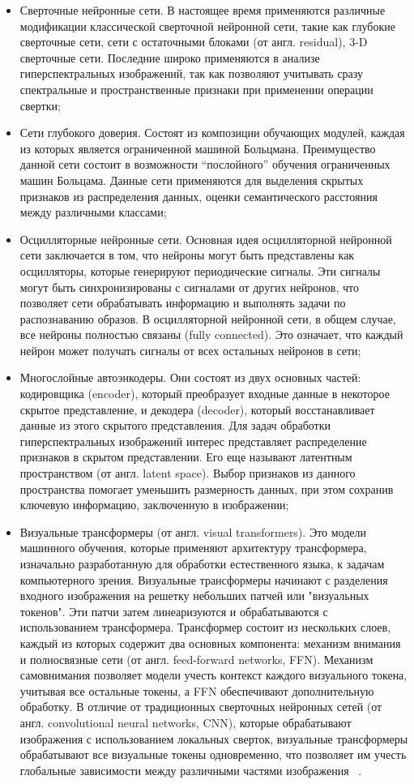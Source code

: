 \documentclass[14pt, russian]{scrartcl}
\begin{document}
\begin{itemize}
    \item Сверточные нейронные сети. В настоящее время применяются различные модификации классической сверточной нейронной сети, такие как глубокие сверточные сети, сети с остаточными блоками (от англ. residual), 3-D сверточные сети. Последние широко применяются в анализе гиперспектральных изображений, так как позволяют учитывать сразу спектральные и пространственные признаки при применении операции свертки;
    \item Сети глубокого доверия. Состоят из композиции обучающих модулей, каждая из которых является ограниченной машиной Больцмана. Преимущество данной сети состоит в возможности “послойного” обучения ограниченных машин Больцама. Данные сети применяются для выделения скрытых признаков из распределения данных, оценки семантического расстояния между различными классами;
    \item Осцилляторные нейронные сети. Основная идея осцилляторной нейронной сети заключается в том, что нейроны могут быть представлены как осцилляторы, которые генерируют периодические сигналы. Эти сигналы могут быть синхронизированы с сигналами от других нейронов, что позволяет сети обрабатывать информацию и выполнять задачи по распознаванию образов. В осцилляторной нейронной сети, в общем случае, все нейроны полностью связаны (fully connected). Это означает, что каждый нейрон может получать сигналы от всех остальных нейронов в сети;
    \item Многослойные автоэнкодеры. Они состоят из двух основных частей: кодировщика (encoder), который преобразует входные данные в некоторое скрытое представление, и декодера (decoder), который восстанавливает данные из этого скрытого представления. Для задач обработки гиперспектральных изображений интерес представляет распределение признаков в скрытом представлении. Его еще называют латентным пространством (от англ. latent space). Выбор признаков из данного пространства помогает уменьшить размерность данных, при этом сохранив ключевую информацию, заключенную в изображении;
    \item Визуальные трансформеры (от англ. visual transformers). Это модели машинного обучения, которые применяют архитектуру трансформера, изначально разработанную для обработки естественного языка, к задачам компьютерного зрения. Визуальные трансформеры начинают с разделения входного изображения на решетку небольших патчей или "визуальных токенов". Эти патчи затем линеаризуются и обрабатываются с использованием трансформера. Трансформер состоит из нескольких слоев, каждый из которых содержит два основных компонента: механизм внимания и полносвязные сети (от англ. feed-forward networks, FFN). Механизм самовнимания позволяет модели учесть контекст каждого визуального токена, учитывая все остальные токены, а FFN обеспечивают дополнительную обработку. В отличие от традиционных сверточных нейронных сетей (от англ. convolutional neural networks, CNN), которые обрабатывают изображения с использованием локальных сверток, визуальные трансформеры обрабатывают все визуальные токены одновременно, что позволяет им учесть глобальные зависимости между различными частями изображения ~\cite{25}.
\end{itemize}
\end{document}

